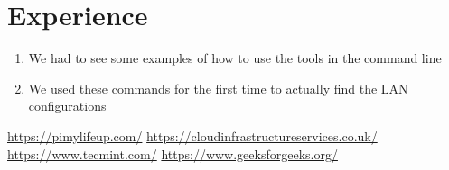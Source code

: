 \documentclass[11pt]{article}
\begin{document}
\newpage

\section{Experience}
\begin{enumerate}
    \item We had to see some examples of how to use the tools in the command line
    \item We used these commands for the first time to actually find the LAN configurations
\end{enumerate}

\begin{thebibliography}{1}
      \url{https://pimylifeup.com/}
     \url{https://cloudinfrastructureservices.co.uk/}
     \url{https://www.tecmint.com/}
     \url{https://www.geeksforgeeks.org/}
\end{thebibliography}
\end{document}
